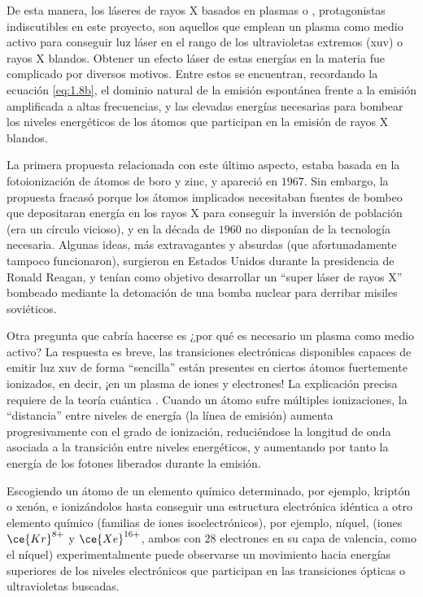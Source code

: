 De esta manera, los láseres de rayos X basados en plasmas o \emph{}, protagonistas indiscutibles en este proyecto, son aquellos que emplean un plasma como medio activo para conseguir luz láser en el rango de los ultravioletas extremos (\acrshort{xuv}) o rayos X blandos. Obtener un efecto láser de estas energías en la materia fue complicado por diversos motivos. Entre estos se encuentran, recordando la ecuación \eqref{eq:1.8b}, el dominio natural de la emisión espontánea frente a la emisión amplificada a altas frecuencias, y las elevadas energías necesarias para bombear los niveles energéticos de los átomos que participan en la emisión de rayos X blandos. 

La primera propuesta \autocite{Duguay1967} relacionada con este último aspecto, estaba basada en la fotoionización de átomos de boro y zinc, y apareció en $1967$. Sin embargo, la propuesta fracasó porque los átomos implicados necesitaban fuentes de bombeo que depositaran energía en los rayos X para conseguir la inversión de población (era un círculo vicioso), y en la década de $1960$ no disponían de la tecnología necesaria. Algunas ideas, más extravagantes y absurdas \autocite{Thorne2017} (que afortunadamente tampoco funcionaron), surgieron en Estados Unidos durante la presidencia de Ronald Reagan, y tenían como objetivo desarrollar un \enquote{super láser de rayos X} bombeado mediante la detonación de una bomba nuclear para derribar misiles soviéticos.

Otra pregunta que cabría hacerse es ¿por qué es necesario un plasma como medio activo? La respuesta es breve, las transiciones electrónicas disponibles capaces de emitir luz \acrshort{xuv} de forma \enquote{sencilla} están presentes en ciertos átomos fuertemente ionizados, en decir, ¡en un plasma de iones y electrones! La explicación precisa requiere de la teoría cuántica \autocite{Sakurai2020}. Cuando un átomo sufre múltiples ionizaciones, la \enquote{distancia} entre niveles de energía (la línea de emisión) aumenta progresivamente con el grado de ionización, reduciéndose la longitud de onda asociada a la transición entre niveles energéticos, y aumentando por tanto la energía de los fotones liberados durante la emisión. 

Escogiendo un átomo de un elemento químico determinado, por ejemplo, kriptón o xenón, e ionizándolos hasta conseguir una estructura electrónica idéntica a otro elemento químico (familias de iones isoelectrónicos), por ejemplo, níquel, (iones $\ce{Kr}^{8+}$ y $\ce{Xe}^{16+}$, ambos con $28$ electrones en su capa de valencia, como el níquel) experimentalmente puede observarse un movimiento hacia energías superiores de los niveles electrónicos que participan en las transiciones ópticas o ultravioletas buscadas. 

